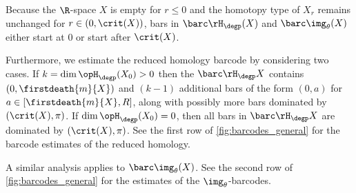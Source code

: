 Because the $\R$-space $X$ is empty for \(r \leq 0\) and the homotopy type of $X_r$ remains unchanged for $r \in (0, \crit(X))$, bars in \(\barc \rH_\degp(X)\) and $\barc\img_\theta(X)$ either start at $0$ or start after $\crit(X)$.

Furthermore, we estimate the reduced homology barcode by considering two cases.
If \(k = \dim \opH_\degp(X_0) > 0\) then the $\barc\rH_\degp X$ contains $(0,\firstdeath{m}{X})$ and \((k - 1)\) additional bars of the form \((0, a)\) for \(a \in [\firstdeath{m}{X}, R]\), along with possibly more bars dominated by \((\crit(X), \pi)\).
If $\dim \opH_\degp(X_0) = 0$, then all bars in $\barc\rH_\degp X$ are dominated by \((\crit(X), \pi)\).
See the first row of \cref{fig:barcodes_general} for the barcode estimates of the reduced homology.

A similar analysis applies to $\barc\img_\theta(X)$.
See the second row of \cref{fig:barcodes_general} for the estimates of the $\img_\theta$-barcodes.





